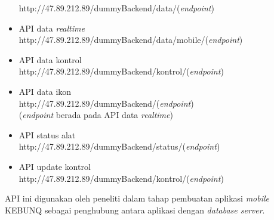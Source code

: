 \begin{flushleft}
\begin{justify}
\begin{itemize}
                http://47.89.212.89/dummyBackend/data/(\emph{endpoint})
                \item API data \emph{realtime}\\
                http://47.89.212.89/dummyBackend/data/mobile/(\emph{endpoint})
                \item API data kontrol\\
                http://47.89.212.89/dummyBackend/kontrol/(\emph{endpoint})
                \item API data ikon\\
                http://47.89.212.89/dummyBackend/(\emph{endpoint}) \\
                (\emph{endpoint} berada pada API data \emph{realtime})
                \item API status alat\\
                http://47.89.212.89/dummyBackend/status/(\emph{endpoint})
                \item API update kontrol\\
                http://47.89.212.89/dummyBackend/kontrol/(\emph{endpoint})
            \end{itemize}
        API ini digunakan oleh peneliti dalam tahap pembuatan aplikasi \emph{mobile} KEBUNQ sebagai penghubung antara aplikasi dengan \emph{database server}.\\
        

        


\end{justify}
\end{flushleft}
